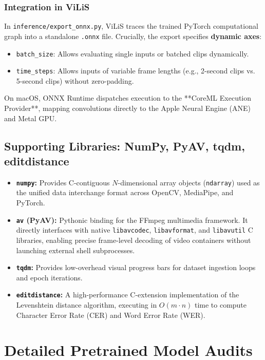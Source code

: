 \documentclass[11pt,a4paper]{report}
\begin{document}
\subsection{Integration in ViLiS}
In \texttt{inference/export\_onnx.py}, ViLiS traces the trained PyTorch computational graph into a standalone \texttt{.onnx} file. Crucially, the export specifies \textbf{dynamic axes}:
\begin{itemize}
    \item \texttt{batch\_size}: Allows evaluating single inputs or batched clips dynamically.
    \item \texttt{time\_steps}: Allows inputs of variable frame lengths (e.g., 2-second clips vs. 5-second clips) without zero-padding.
\end{itemize}
On macOS, ONNX Runtime dispatches execution to the **CoreML Execution Provider**, mapping convolutions directly to the Apple Neural Engine (ANE) and Metal GPU.

\section{Supporting Libraries: NumPy, PyAV, tqdm, editdistance}
\begin{itemize}
    \item \textbf{\texttt{numpy}:} Provides C-contiguous $N$-dimensional array objects (\texttt{ndarray}) used as the unified data interchange format across OpenCV, MediaPipe, and PyTorch.
    \item \textbf{\texttt{av} (PyAV):} Pythonic binding for the FFmpeg multimedia framework. It directly interfaces with native \texttt{libavcodec}, \texttt{libavformat}, and \texttt{libavutil} C libraries, enabling precise frame-level decoding of video containers without launching external shell subprocesses.
    \item \textbf{\texttt{tqdm}:} Provides low-overhead visual progress bars for dataset ingestion loops and epoch iterations.
    \item \textbf{\texttt{editdistance}:} A high-performance C-extension implementation of the Levenshtein distance algorithm, executing in $O(m \cdot n)$ time to compute Character Error Rate (CER) and Word Error Rate (WER).
\end{itemize}

\chapter{Detailed Pretrained Model Audits}
\end{document}
